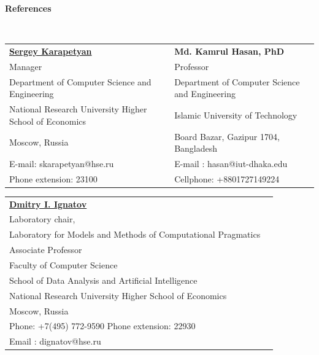 \documentclass[letterpaper,10pt]{article}
\newcommand{\resheading}[1]{{\large \colorbox{mygrey}{\begin{minipage}{\textwidth}{\textbf{#1 \vphantom{p\^{E}}}}\end{minipage}}}}
\begin{document}
\resheading{References}\\


\vspace{0.1in}

\begin{tabular*} {7in} {l@{\extracolsep{\fill}}l}
\textbf{\large \href{https://www.hse.ru/en/org/persons/222507810}{Sergey Karapetyan}}  & \textbf{Md. Kamrul Hasan, PhD}\\
Manager & Professor\\
Department of Computer Science and Engineering & Department of Computer Science and Engineering \\
National Research University Higher School of Economics & Islamic University of Technology\\
Moscow, Russia &  Board Bazar, Gazipur 1704, Bangladesh\\
E-mail: skarapetyan@hse.ru &  E-mail : hasan@iut-dhaka.edu\\
Phone extension: 23100 & Cellphone: +8801727149224
\end{tabular*}

\vspace{0.1in}

\begin{tabular*} {7in} {l@{\extracolsep{\fill}}l}
\textbf{\large \href{https://www.hse.ru/en/staff/dima}{Dmitry I. Ignatov}}   \\

Laboratory chair,  \\
Laboratory for Models and Methods of Computational Pragmatics \\
Associate Professor \\
Faculty of Computer Science \\
School of Data Analysis and Artificial Intelligence \\
National Research University Higher School of Economics \\
Moscow, Russia \\ 
Phone: +7(495) 772-9590 Phone extension: 22930 \\
Email : dignatov@hse.ru \\
\end{tabular*}
\end{document}
